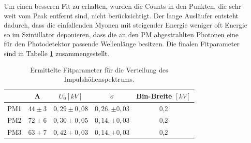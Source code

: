             Um einen besseren Fit zu erhalten, wurden die Counts in den Punkten, die sehr weit vom Peak entfernt sind, nicht berücksichtigt. Der lange Ausläufer entsteht dadurch, dass die einfallenden Myonen mit steigender Energie weniger oft Energie so im Szintillator deponieren, dass die an den PM abgestrahlten Photonen eine für den Photodetektor passende Wellenlänge besitzen. Die finalen Fitparameter sind in Tabelle \ref{tab:fitparams} zusammengestellt.
            \begin{table}[ht]
            	\centering
                \begin{tabular}{c|c|c|c|c}
                	& A & $U_0 [\unit{kV}]$ & $\sigma$ & Bin-Breite $[\unit{kV}]$\\
                	\hline     PM1& $44\pm3$ & $0,29\pm0,08$ & $0,26,\pm0,03$& 0,2\\
                   			   PM2& $72\pm6$ & $0,30\pm0,05$ & $0,14,\pm0,03$& 0,2\\
                               PM3& $63\pm7$ & $0,42\pm0,03$ & $0,14,\pm0,03$& 0,2
                \end{tabular}
                \caption{Ermittelte Fitparameter für die Verteilung des Impulshöhenspektrums.}
                \label{tab:fitparams}	
            \end{table}
